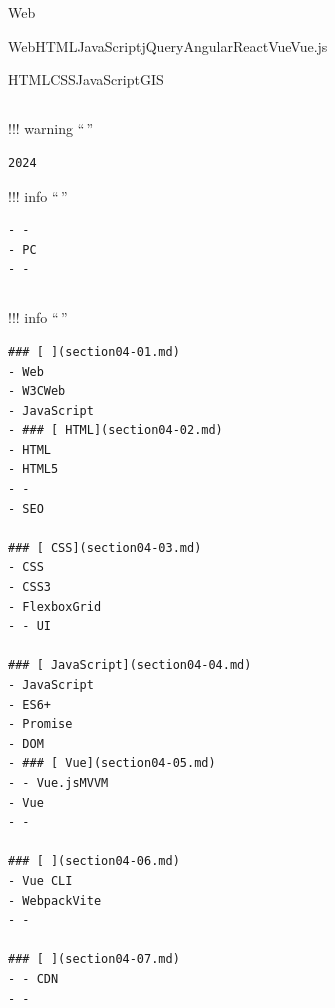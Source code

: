 \hypertarget{section}{%
\section{}\label{section}}


\hypertarget{section-1}{%
\subsection{}\label{section-1}}

Web

WebHTMLJavaScriptjQueryAngularReactVueVue.js

HTMLCSSJavaScriptGIS

\hypertarget{section-2}{%
\subsection{}\label{section-2}}

!!! warning ``\,''

\begin{verbatim}
2024
\end{verbatim}

!!! info ``\,''

\begin{verbatim}
- - 
- PC
- - 
\end{verbatim}

\hypertarget{section-3}{%
\subsection{}\label{section-3}}

!!! info ``\,''

\begin{verbatim}
### [ ](section04-01.md)
- Web
- W3CWeb
- JavaScript
- ### [ HTML](section04-02.md)
- HTML
- HTML5
- - 
- SEO

### [ CSS](section04-03.md)
- CSS
- CSS3
- FlexboxGrid
- - UI

### [ JavaScript](section04-04.md)
- JavaScript 
- ES6+
- Promise
- DOM
- ### [ Vue](section04-05.md)
- - Vue.jsMVVM
- Vue 
- - 

### [ ](section04-06.md)
- Vue CLI
- WebpackVite
- - 

### [ ](section04-07.md)
- - CDN
- - 
\end{verbatim}


